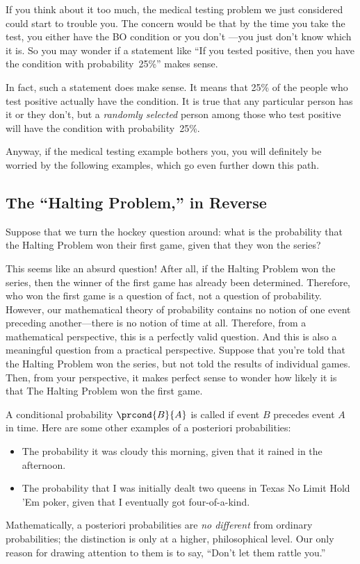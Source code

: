 If you think about it too much, the medical testing problem we just
considered could start to trouble you.  The concern would be that by
the time you take the test, you either have the BO condition or you
don't ---you just don't know which it is.  So you may wonder if a
statement like ``If you tested positive, then you have the condition
with probability~25\%'' makes sense.

In fact, such a statement does make sense.  It means that 25\% of the
people who test positive actually have the condition.  It is true that
any particular person has it or they don't, but a \emph{randomly
  selected} person among those who test positive will have the
condition with probability~25\%.

Anyway, if the medical testing example bothers you, you will
definitely be worried by the following examples, which go even further
down this path.

\subsection{The ``Halting Problem,'' in Reverse}

Suppose that we turn the hockey question around: what is the
probability that the Halting Problem won their first game, given that
they won the series?

This seems like an absurd question!  After all, if the Halting Problem
won the series, then the winner of the first game has already been
determined.  Therefore, who won the first game is a question of fact,
not a question of probability.  However, our mathematical theory of
probability contains no notion of one event preceding another---there
is no notion of time at all.  Therefore, from a mathematical
perspective, this is a perfectly valid question.  And this is also a
meaningful question from a practical perspective.  Suppose that you're
told that the Halting Problem won the series, but not told the results
of individual games.  Then, from your perspective, it makes perfect
sense to wonder how likely it is that The Halting Problem won the
first game.

A conditional probability $\prcond{B}{A}$ is called   if event $B$ precedes event $A$ in time.  Here are some
other examples of a posteriori probabilities:
%
\begin{itemize}
\item The probability it was cloudy this morning, given that it rained
in the afternoon.
\item The probability that I was initially dealt two queens in Texas
No Limit Hold 'Em poker, given that I eventually got four-of-a-kind.
\end{itemize}
%
Mathematically, a posteriori probabilities are \emph{no different}
from ordinary probabilities; the distinction is only at a higher,
philosophical level.  Our only reason for drawing attention to them is
to say, ``Don't let them rattle you.''

